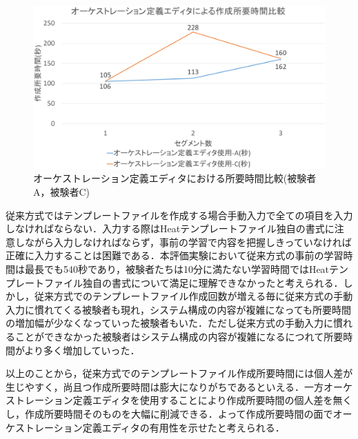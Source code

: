 \documentclass[mingoth]{kut-paper}		%
\begin{document}
\begin{description}
		\begin{figure}[H]
			\begin{center}
				\includegraphics[scale=0.45]{Document/EditorComparisonAC.eps}
				\caption{オーケストレーション定義エディタにおける所要時間比較(被験者A，被験者C)}
				\label{graf:5}
			\end{center}
		\end{figure}
		従来方式ではテンプレートファイルを作成する場合手動入力で全ての項目を入力しなければならない．入力する際はHeatテンプレートファイル独自の書式に注意しながら入力しなければならず，事前の学習で内容を把握しきっていなければ正確に入力することは困難である．本評価実験において従来方式の事前の学習時間は最長でも540秒であり，被験者たちは10分に満たない学習時間ではHeatテンプレートファイル独自の書式について満足に理解できなかったと考えられる．しかし，従来方式でのテンプレートファイル作成回数が増える毎に従来方式の手動入力に慣れてくる被験者も現れ，システム構成の内容が複雑になっても所要時間の増加幅が少なくなっていった被験者もいた．ただし従来方式の手動入力に慣れることができなかった被験者はシステム構成の内容が複雑になるにつれて所要時間がより多く増加していった．
			
		以上のことから，従来方式でのテンプレートファイル作成所要時間には個人差が生じやすく，尚且つ作成所要時間は膨大になりがちであるといえる．一方オーケストレーション定義エディタを使用することにより作成所要時間の個人差を無くし，作成所要時間そのものを大幅に削減できる．よって作成所要時間の面でオーケストレーション定義エディタの有用性を示せたと考えられる．
		

\end{description}
\end{document}
